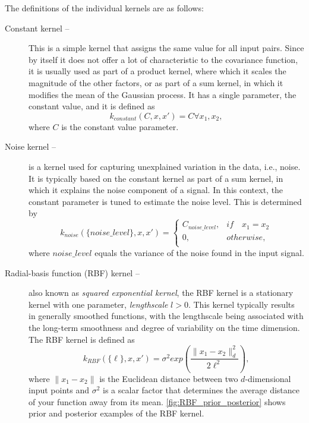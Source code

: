 The definitions of the individual kernels are as follows:

\begin{description}
	\item[Constant kernel -- ]
	This is a simple kernel that assigns the same value for all input pairs.
	Since by itself it does not offer a lot of characteristic to the covariance function, it is usually used as part of a product kernel, where which it scales the magnitude of the other factors, or as part of a sum kernel, in which it modifies the mean of the Gaussian process.
	It has a single parameter, the constant value, and it is defined as 
	\begin{equation}
		\label{eq:constant_kernel}
		k_{constant}(C, x, x') = C\forall x_1, x_2,
	\end{equation}
	where $C$ is the constant value parameter.
	
	\item[Noise kernel -- ]
	is a kernel used for capturing unexplained variation in the data, i.e., noise.
	It is typically based on the constant kernel as part of a sum kernel, in which it explains the noise component of a signal.
	In this context, the constant parameter is tuned to estimate the noise level.
	This is determined by
	\begin{equation}
		\label{eq:noise_kernel}
		k_{noise}(\{noise\_level\}, x, x') =
		\begin{cases}
		C_{noise\_level}, & if\quad x_1 = x_2\\
		0, & otherwise,\\
		\end{cases}
	\end{equation}
	where $noise\_level$ equals the variance of the noise found in the input signal.
	
	\item[Radial-basis function (RBF) kernel --]
	also known as \emph{squared exponential kernel}, the RBF kernel is a stationary kernel with one parameter, \emph{lengthscale} $l > 0$.
	This kernel typically results in generally smoothed functions, with the lengthscale being associated with the long-term smoothness and degree of variability on the time dimension.
	The RBF kernel is defined as
	\begin{equation}
		\label{eq:RBF_kernel}
		k_{RBF}(\{\ell\}, x, x') = \sigma^2 exp\left(\frac{\lVert x_1 - x_2 \lVert ^2_d}{2\ell^2}\right),
	\end{equation}
	where $\lVert x_1 - x_2 \lVert$ is the Euclidean distance between two $d$-dimensional input points and $\sigma^2$ is a scalar factor that determines the average distance of your function away from its mean.
	\cref{fig:RBF_prior_posterior} shows prior and posterior examples of the RBF kernel.
	

\end{description}
